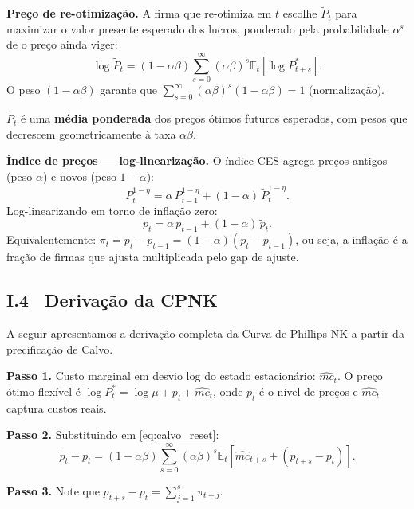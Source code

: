 \documentclass[12pt, a4paper]{article}
\newcommand{\E}{\mathbb{E}}
\begin{document}
\textbf{Preço de re-otimização.}
A firma que re-otimiza em $t$ escolhe $\tilde{P}_t$ para maximizar o valor presente
esperado dos lucros, ponderado pela probabilidade $\alpha^s$ de o preço ainda viger:
\begin{equation}
\log\tilde{P}_t = (1-\alpha\beta)\sum_{s=0}^{\infty}(\alpha\beta)^s
  \E_t\!\left[\log P_{t+s}^*\right].
\label{eq:calvo_reset}
\end{equation}
O peso $(1-\alpha\beta)$ garante que $\sum_{s=0}^\infty (\alpha\beta)^s(1-\alpha\beta) = 1$
(normalização).

\begin{formulabox}[title={Preço de re-otimização de Calvo}]
$\tilde{P}_t$ é uma \textbf{média ponderada} dos preços ótimos futuros esperados,
com pesos que decrescem geometricamente à taxa $\alpha\beta$.
\end{formulabox}

\textbf{Índice de preços --- log-linearização.}
O índice CES agrega preços antigos (peso $\alpha$) e novos (peso $1-\alpha$):
\[
P_t^{1-\eta} = \alpha\,P_{t-1}^{1-\eta} + (1-\alpha)\,\tilde{P}_t^{1-\eta}.
\]
Log-linearizando em torno de inflação zero:
\begin{equation}
p_t = \alpha\,p_{t-1} + (1-\alpha)\,\tilde{p}_t.
\label{eq:price_index}
\end{equation}
Equivalentemente: $\pi_t = p_t - p_{t-1} = (1-\alpha)(\tilde{p}_t - p_{t-1})$,
ou seja, a inflação é a fração de firmas que ajusta multiplicada pelo gap de ajuste.

\subsection*{I.4 \ Derivação da CPNK}

A seguir apresentamos a derivação completa da Curva de Phillips NK a partir da
precificação de Calvo.

\textbf{Passo 1.} Custo marginal em desvio log do estado estacionário:
$\hat{mc}_t$. O preço ótimo flexível é $\log P_t^* = \log\mu + p_t + \hat{mc}_t$,
onde $p_t$ é o nível de preços e $\hat{mc}_t$ captura custos reais.

\textbf{Passo 2.} Substituindo em \eqref{eq:calvo_reset}:
\[
\tilde{p}_t - p_t = (1-\alpha\beta)\sum_{s=0}^{\infty}(\alpha\beta)^s
  \E_t\!\left[\hat{mc}_{t+s} + (p_{t+s} - p_t)\right].
\]

\textbf{Passo 3.} Note que $p_{t+s} - p_t = \sum_{j=1}^s \pi_{t+j}$.
\end{document}
